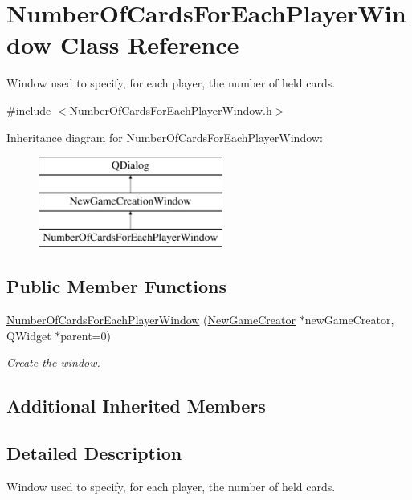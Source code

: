 \hypertarget{classNumberOfCardsForEachPlayerWindow}{}\section{Number\+Of\+Cards\+For\+Each\+Player\+Window Class Reference}
\label{classNumberOfCardsForEachPlayerWindow}


Window used to specify, for each player, the number of held cards.  




{\ttfamily \#include $<$Number\+Of\+Cards\+For\+Each\+Player\+Window.\+h$>$}

Inheritance diagram for Number\+Of\+Cards\+For\+Each\+Player\+Window\+:\begin{figure}[H]
\begin{center}
\leavevmode
\includegraphics[height=3.000000cm]{classNumberOfCardsForEachPlayerWindow}
\end{center}
\end{figure}
\subsection*{Public Member Functions}
\begin{DoxyCompactItemize}
\item 
\hyperlink{classNumberOfCardsForEachPlayerWindow_aadd6710e807d6ac5a401c1ecbe51792b}{Number\+Of\+Cards\+For\+Each\+Player\+Window} (\hyperlink{classNewGameCreator}{New\+Game\+Creator} $\ast$new\+Game\+Creator, Q\+Widget $\ast$parent=0)
\begin{DoxyCompactList}\small\item\em Create the window. \end{DoxyCompactList}\end{DoxyCompactItemize}
\subsection*{Additional Inherited Members}


\subsection{Detailed Description}
Window used to specify, for each player, the number of held cards. 

